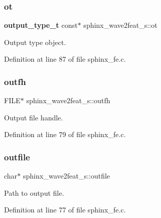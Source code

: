 \mbox{\label{structsphinx__wave2feat__s_a929e05e041ad922f6a2e35637a98c917}} 
\subsubsection{ot}
{\footnotesize\ttfamily \textbf{ output\+\_\+type\+\_\+t} const$\ast$ sphinx\+\_\+wave2feat\+\_\+s\+::ot}



Output type object. 



Definition at line 87 of file sphinx\+\_\+fe.\+c.

\mbox{\label{structsphinx__wave2feat__s_ad7340fab24fb182cbff2c73fd1fb3671}} 
\subsubsection{outfh}
{\footnotesize\ttfamily F\+I\+LE$\ast$ sphinx\+\_\+wave2feat\+\_\+s\+::outfh}



Output file handle. 



Definition at line 79 of file sphinx\+\_\+fe.\+c.

\mbox{\label{structsphinx__wave2feat__s_aa50405dc75074933912da57295ec5fbf}} 
\subsubsection{outfile}
{\footnotesize\ttfamily char$\ast$ sphinx\+\_\+wave2feat\+\_\+s\+::outfile}



Path to output file. 



Definition at line 77 of file sphinx\+\_\+fe.\+c.

\mbox{\label{structsphinx__wave2feat__s_ae9b2fc4bfa6a3adbf2ee5a71796cdb51}} 
